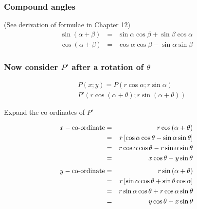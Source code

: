 \subsubsection{Compound angles}
(See derivation of formulae in Chapter 12)
\begin{eqnarray*}
\sin{(\alpha + \beta)} &=& \sin{\alpha}\cos{\beta} + \sin{\beta}\cos{\alpha}\\
\cos{(\alpha + \beta)} &=& \cos{\alpha}\cos{\beta} - \sin{\alpha}\sin{\beta}
\end{eqnarray*}

\subsubsection{Now consider $P'$ after a rotation of $\theta$}

\begin{minipage}{0.6\textwidth}
\begin{eqnarray*}
&& P(x; y) = P(r\cos{\alpha}; r\sin{\alpha})\\
&& P'(r\cos{(\alpha + \theta)}; r\sin{(\alpha + \theta)})
\end{eqnarray*}

Expand the co-ordinates of $P'$

\begin{eqnarray*}
x-\textnormal{co-ordinate}&=& r\cos{(\alpha + \theta)} \\
 &=& r\left[\cos{\alpha}\cos{\theta} - \sin{\alpha}\sin{\theta}\right] \\
 &=& r\cos{\alpha}\cos{\theta} - r\sin{\alpha}\sin{\theta}\\
 &=& x\cos{\theta} - y\sin{\theta}
\end{eqnarray*}
\begin{eqnarray*}
y-\textnormal{co-ordinate}&=& r\sin{(\alpha + \theta)} \\
 &=& r\left[\sin{\alpha}\cos{\theta} + \sin{\theta}\cos{\alpha}\right] \\
 &=& r\sin{\alpha}\cos{\theta} + r\cos{\alpha}\sin{\theta}\\
 &=& y\cos{\theta} + x\sin{\theta}
\end{eqnarray*}
\end{minipage}
